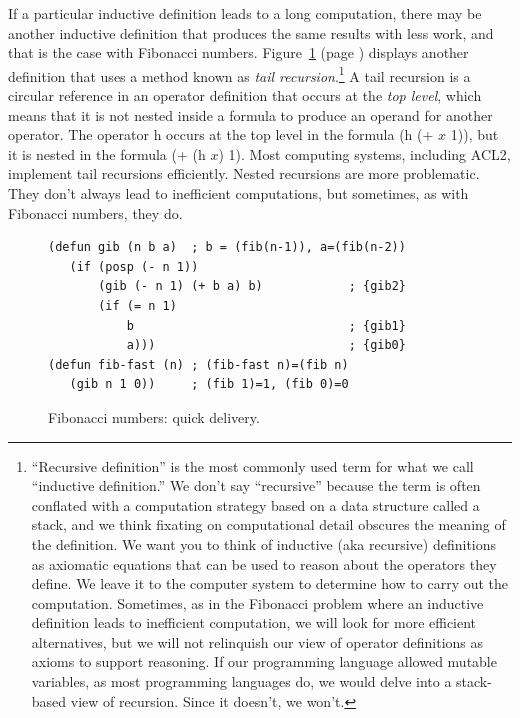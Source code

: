 If a particular inductive definition leads to a long computation,
there may be another inductive definition that produces the same
results with less work,
and that is the case with Fibonacci numbers.
Figure~\ref{fig:gib-defun} (page \pageref{fig:gib-defun})
displays another definition that uses a method known as
\emph{tail recursion}.\footnote{``Recursive definition''
is the most commonly used term for what we call ``inductive definition.''
We don't say ``recursive'' because the term is often conflated
with a computation strategy based on a data structure called a stack,
and we think fixating on computational detail obscures the meaning
of the definition.
We want you to think of inductive (aka recursive)
definitions as axiomatic equations that can be used to reason about the
operators they define. We leave it to the computer system
to determine how to carry out the computation.
Sometimes, as in the Fibonacci problem
where an inductive definition leads to inefficient computation,
we will look for more efficient alternatives,
but we will not relinquish our view of operator definitions
as axioms to support reasoning. If our programming language allowed
mutable variables, as most programming languages do, we would
delve into a stack-based view of recursion.
Since it doesn't, we won't.}
A tail recursion is a circular reference in an operator definition
that occurs at the
\emph{top level},
which means that it is not nested
inside a formula to produce an operand for another operator.
The operator \textsf{h} occurs at the top level
in the formula \textsf{(h (+ $x$ 1))},
but it is nested in the formula \textsf{(+ (h $x$) 1)}.
Most computing systems, including ACL2,
implement tail recursions efficiently. Nested recursions are
more problematic. They don't always lead to inefficient computations,
but sometimes, as with Fibonacci numbers, they do.

\begin{figure}
\begin{center}
\begin{code}
\begin{verbatim}
(defun gib (n b a)  ; b = (fib(n-1)), a=(fib(n-2))
   (if (posp (- n 1))
       (gib (- n 1) (+ b a) b)            ; {gib2}
       (if (= n 1)
           b                              ; {gib1}
           a)))                           ; {gib0}
(defun fib-fast (n) ; (fib-fast n)=(fib n)
   (gib n 1 0))     ; (fib 1)=1, (fib 0)=0
\end{verbatim}
\end{code}
\end{center}
\caption{Fibonacci numbers: quick delivery.}
\label{fig:gib-defun}
\end{figure}

